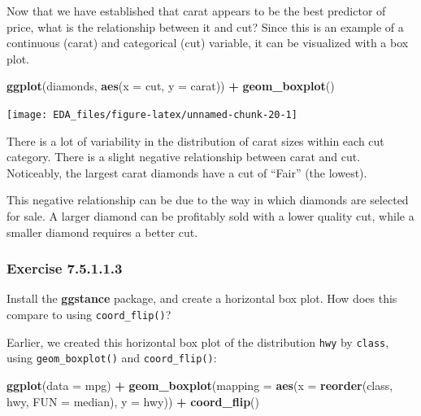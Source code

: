 \documentclass[]{book}
\newenvironment{Shaded}{\begin{snugshade}}{\end{snugshade}}
\newcommand{\DataTypeTok}[1]{\textcolor[rgb]{0.13,0.29,0.53}{#1}}
\newcommand{\KeywordTok}[1]{\textcolor[rgb]{0.13,0.29,0.53}{\textbf{#1}}}
\newcommand{\NormalTok}[1]{#1}
\newcommand{\OperatorTok}[1]{\textcolor[rgb]{0.81,0.36,0.00}{\textbf{#1}}}
\newcommand{\StringTok}[1]{\textcolor[rgb]{0.31,0.60,0.02}{#1}}
\theoremstyle{plain}
\theoremstyle{remark}
\begin{document}
Now that we have established that carat appears to be the best predictor of price, what is the relationship between it and cut?
Since this is an example of a continuous (carat) and categorical (cut) variable, it can be visualized with a box plot.

\begin{Shaded}
\begin{Highlighting}[]
\KeywordTok{ggplot}\NormalTok{(diamonds, }\KeywordTok{aes}\NormalTok{(}\DataTypeTok{x =}\NormalTok{ cut, }\DataTypeTok{y =}\NormalTok{ carat)) }\OperatorTok{+}
\StringTok{  }\KeywordTok{geom_boxplot}\NormalTok{()}
\end{Highlighting}
\end{Shaded}

\begin{center}\texttt{[image: EDA\_files/figure-latex/unnamed-chunk-20-1]} \end{center}

There is a lot of variability in the distribution of carat sizes within each cut category.
There is a slight negative relationship between carat and cut.
Noticeably, the largest carat diamonds have a cut of ``Fair'' (the lowest).

This negative relationship can be due to the way in which diamonds are selected for sale.
A larger diamond can be profitably sold with a lower quality cut, while a smaller diamond requires a better cut.

\hypertarget{exercise-7.5.1.1.3}{%
\subsubsection*{\texorpdfstring{Exercise {7.5.1.1.3}}{Exercise 7.5.1.1.3}}\label{exercise-7.5.1.1.3}}

Install the \textbf{ggstance} package, and create a horizontal box plot.
How does this compare to using \texttt{coord\_flip()}?

Earlier, we created this horizontal box plot of the distribution \texttt{hwy} by \texttt{class}, using \texttt{geom\_boxplot()} and \texttt{coord\_flip()}:

\begin{Shaded}
\begin{Highlighting}[]
\KeywordTok{ggplot}\NormalTok{(}\DataTypeTok{data =}\NormalTok{ mpg) }\OperatorTok{+}
\StringTok{  }\KeywordTok{geom_boxplot}\NormalTok{(}\DataTypeTok{mapping =} \KeywordTok{aes}\NormalTok{(}\DataTypeTok{x =} \KeywordTok{reorder}\NormalTok{(class, hwy, }\DataTypeTok{FUN =}\NormalTok{ median), }\DataTypeTok{y =}\NormalTok{ hwy)) }\OperatorTok{+}
\StringTok{  }\KeywordTok{coord_flip}\NormalTok{()}
\end{Highlighting}
\end{Shaded}
\end{document}
